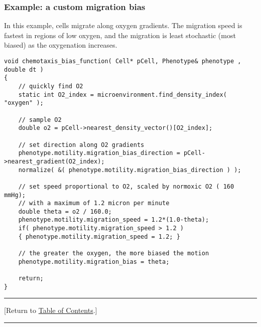 \documentclass[12pt]{article}
\newcommand{\TOClink}{\begin{center}\hrule\vskip-5pt\phantom{.}\hfill[Return to \hyperlink{TOC}{Table of Contents}.]\hfill\phantom{.}\vskip3pt\hrule\end{center}}
\begin{document}
\subsubsection{Example: a custom migration bias}
\label{sec:Examples:migration}
In this example, cells migrate along oxygen gradients. The 
migration speed is fastest in regions of low oxygen, 
and the migration is least stochastic (most biased) 
as the oxygenation increases. 
\begin{verbatim}
void chemotaxis_bias_function( Cell* pCell, Phenotype& phenotype , double dt )
{
    // quickly find O2 
    static int O2_index = microenvironment.find_density_index( "oxygen" ); 
    
    // sample O2 
    double o2 = pCell->nearest_density_vector()[O2_index]; 
    
    // set direction along O2 gradients 
    phenotype.motility.migration_bias_direction = pCell->nearest_gradient(O2_index); 
    normalize( &( phenotype.motility.migration_bias_direction ) ); 
    
    // set speed proportional to O2, scaled by normoxic O2 ( 160 mmHg); 
    // with a maximum of 1.2 micron per minute 
    double theta = o2 / 160.0;
    phenotype.motility.migration_speed = 1.2*(1.0-theta);   
    if( phenotype.motility.migration_speed > 1.2 )
    { phenotype.motility.migration_speed = 1.2; } 

    // the greater the oxygen, the more biased the motion 
    phenotype.motility.migration_bias = theta; 
    
    return; 
}
\end{verbatim}

\TOClink 
\end{document}
